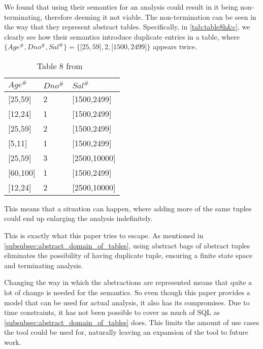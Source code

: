 We found that using their semantics for an analysis could result in it being non-terminating,
therefore deeming it not viable.
The non-termination can be seen in the way that they represent abstract tables.
Specifically, in \autoref{tab:table8h&c},
we clearly see how their semantics introduce duplicate entries in a table, where $\{Age^\#,Dno^\#,Sal^\#\}=\{{[}25,59{]},2,{[}1500,2499{]}\}$ appears twice.
\begin{table}[]
    \centering
    \caption{Table 8 from~\cite{halder_abstract_2012}}
    \begin{tabular}{lll}
        \toprule
        $Age^\#$ & $Dno^\#$ & $Sal^\#$ \\ \midrule
        {[}25,59{]}             & 2                       & {[}1500,2499{]}         \\
        {[}12,24{]}             & 1                       & {[}1500,2499{]}         \\
        {[}25,59{]}             & 2                       & {[}1500,2499{]}         \\
        {[}5,11{]}              & 1                       & {[}1500,2499{]}         \\
        {[}25,59{]}             & 3                       & {[}2500,10000{]}        \\
        {[}60,100{]}            & 1                       & {[}1500,2499{]}         \\
        {[}12,24{]}             & 2                       & {[}2500,10000{]}        \\ \bottomrule
    \end{tabular}\label{tab:table8h&c}
\end{table}
This means that a situation can happen, where adding more of the same tuples could end up enlarging the analysis indefinitely.

This is exactly what this paper tries to escape.
As mentioned in \autoref{subsubsec:abstract_domain_of_tables}, using abstract bags of abstract tuples eliminates the possibility of having duplicate tuple, ensuring a finite state space and terminating analysis.

Changing the way in which the abstractions are represented means that quite a lot of change is needed for the semantics.
So even though this paper provides a model that can be used for actual analysis, it also has its compromises.
Due to time constraints, it has not been possible to cover as much of SQL as \autoref{subsubsec:abstract_domain_of_tables} does.
This limits the amount of use cases the tool could be used for, naturally leaving an expansion of the tool to future work.

